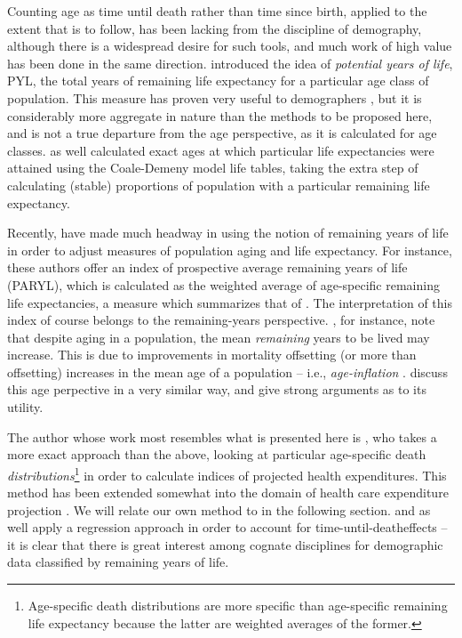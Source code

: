Counting age as time until death rather than time
since birth, applied to the extent that is to
follow, has been lacking from the discipline of demography, although there is a
widespread desire for such tools, and much work of high value has been done in
the same direction. \citet{hersch1944demographie}
introduced the idea of \textit{potential years of life}, PYL, the
total years of remaining life expectancy for a particular age class of
population. This measure has proven very useful to demographers
\citep{panush1996potential}, but it is considerably more aggregate in 
nature than the methods to be proposed
here, and is not a true departure from the age perspective, as it is calculated
for age classes. \citet{ryder1975notes} as well calculated exact ages at which
particular life expectancies were attained using the Coale-Demeny model
life tables, taking the extra step of calculating (stable) proportions
of population with a particular remaining life expectancy.

Recently, 
\citet{sanderson2005average, sanderson2010remeasuring} have made much
headway in using the notion of remaining years of life in
 order to adjust measures of population aging and life expectancy. For instance, 
 these authors offer an index of prospective average remaining years of life
 (PARYL), which is calculated as the weighted average of age-specific 
 remaining life expectancies, a measure which summarizes that of
 \citet{hersch1944demographie}. The interpretation of this index of
 course belongs to the remaining-years perspective.
 \citet{sanderson2005average}, for instance, note that despite aging 
 in a population, the mean \textit{remaining} years to 
 be lived may increase. This is due to improvements in mortality offsetting 
 (or more than offsetting) increases in the mean age of a population -- i.e.,
 \textit{age-inflation} \citep{shoven2010adjusting}. \citet{sanderson2007new}
 discuss this age perpective in a very similar way, and give strong arguments
 as to its utility.

The author whose work most resembles what is
presented here is \citet{miller2001increasing}, who takes a more
exact approach than the above, looking at particular age-specific death
\textit{distributions}\footnote{Age-specific death distributions are more
 specific than age-specific remaining life expectancy because the latter are
 weighted averages of the former.} in order to calculate indices
 of projected health expenditures. This method has been extended somewhat into
 the domain of health care expenditure projection
 \citep{lee2002approach,lee2007demographic,topoleski2004uncertainty}. We will
 relate our own method to \citet{miller2001increasing} in the
 following section. \citet{stearns2004time} and \citet{seshamani2004longitudinal} as well apply a regression approach in
 order to account for time-until-deatheffects -- it is clear that there is
 great interest among cognate disciplines for demographic data classified by remaining
 years of life.
 
